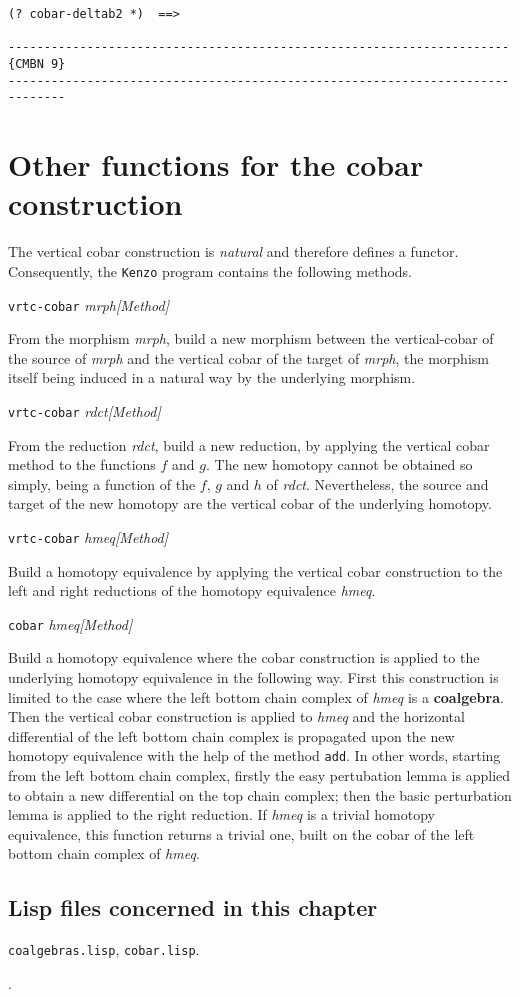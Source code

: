 {\begin{verbatim}
(? cobar-deltab2 *)  ==>

----------------------------------------------------------------------{CMBN 9}
------------------------------------------------------------------------------
\end{verbatim}}
\newpage

\section {Other functions for the cobar construction}

The vertical cobar construction is
{\em natural} and therefore defines a functor.
Consequently, the {\tt Kenzo} program contains the following methods.
\vskip 0.45cm
{\parindent=0mm
{\leftskip=5mm
{\tt vrtc-cobar} {\em mrph}\hfill {\em [Method]} \par}
{\leftskip=15mm
From the morphism {\em mrph}, build a new morphism between the vertical-cobar of the source
of {\em mrph} and the vertical cobar of the target of {\em mrph}, the morphism itself being
induced in a natural way by the underlying morphism. \par}
{\leftskip=5mm
{\tt vrtc-cobar} {\em rdct}\hfill {\em [Method]} \par}
{\leftskip=15mm
From the reduction {\em rdct}, build a new reduction, by applying the vertical cobar
method to the functions $f$ and $g$. The new homotopy cannot be obtained so simply, being
a function of the $f$, $g$ and $h$ of {\em rdct}. Nevertheless, the source and target
of the new homotopy are the vertical cobar of the underlying homotopy. \par}
{\leftskip=5mm
{\tt vrtc-cobar} {\em hmeq}\hfill {\em [Method]} \par}
{\leftskip=15mm
Build a homotopy equivalence by applying the vertical cobar cons\-truc\-ti\-on
to the left and right reductions of the homotopy equivalence {\em hmeq}. \par}
{\leftskip=5mm
{\tt cobar} {\em hmeq}\hfill {\em [Method]} \par}
{\leftskip=15mm
Build a  homotopy equivalence where the cobar construction is applied to the
underlying homotopy equivalence in the following way. First this construction is limited to the
case where the left bottom chain complex of {\em hmeq} is a {\bf coalgebra}. Then the vertical cobar
construction is applied to {\em hmeq} and the horizontal differential of the left bottom chain complex
is propagated upon the new homotopy equivalence with the help of the method {\tt add}. In other words,
starting from the left bottom chain complex, firstly the easy pertubation lemma is applied to
obtain a new differential on the top chain complex; then the basic perturbation lemma
is applied to the right reduction.
If {\em hmeq} is a
trivial homotopy equivalence, this function returns a trivial one, built on the cobar of
the left bottom chain complex of {\em hmeq}. \par}
}

\subsection* {Lisp files concerned in this chapter}

{\tt coalgebras.lisp}, {\tt cobar.lisp}.
\par
[{\tt classes.lisp}, {\tt macros.lisp}, {\tt various.lisp}].
